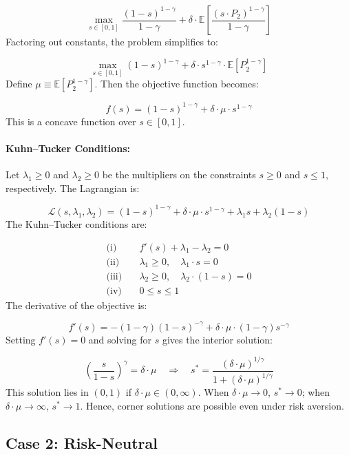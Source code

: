 \documentclass[12pt]{article}
\begin{document}
\[
\max_{s \in [0,1]}  \frac{(1 - s)^{1 - \gamma}}{1 - \gamma} + \delta \cdot \mathbb{E} \left[ \frac{(s \cdot P_2)^{1 - \gamma}}{1 - \gamma} \right] 
\]
Factoring out constants, the problem simplifies to:

\[
\max_{s \in [0,1]}  (1 - s)^{1 - \gamma} + \delta \cdot s^{1 - \gamma} \cdot \mathbb{E}[P_2^{1 - \gamma}] 
\]
Define \( \mu \equiv \mathbb{E}[P_2^{1 - \gamma}] \). Then the objective function becomes:

\[
f(s) = (1 - s)^{1 - \gamma} + \delta \cdot \mu \cdot s^{1 - \gamma}
\]
This is a concave function over \( s \in [0,1] \).

\paragraph{Kuhn–Tucker Conditions:}
Let \( \lambda_1 \geq 0 \) and \( \lambda_2 \geq 0 \) be the multipliers on the constraints \( s \geq 0 \) and \( s \leq 1 \), respectively. The Lagrangian is:

\[
\mathcal{L}(s, \lambda_1, \lambda_2) = (1 - s)^{1 - \gamma} + \delta \cdot \mu \cdot s^{1 - \gamma} + \lambda_1 s + \lambda_2 (1 - s)
\]
The Kuhn–Tucker conditions are:

\begin{align*}
\text{(i)} \quad & f'(s) + \lambda_1 - \lambda_2 = 0 \\
\text{(ii)} \quad & \lambda_1 \geq 0,\quad \lambda_1 \cdot s = 0 \\
\text{(iii)} \quad & \lambda_2 \geq 0,\quad \lambda_2 \cdot (1 - s) = 0 \\
\text{(iv)} \quad & 0 \leq s \leq 1
\end{align*}
The derivative of the objective is:

\[
f'(s) = - (1 - \gamma)(1 - s)^{-\gamma} + \delta \cdot \mu \cdot (1 - \gamma) s^{-\gamma}
\]
Setting \( f'(s) = 0 \) and solving for \( s \) gives the interior solution:

\[
\left( \frac{s}{1 - s} \right)^\gamma = \delta \cdot \mu
\quad \Longrightarrow \quad
s^* = \frac{(\delta \cdot \mu)^{1/\gamma}}{1 + (\delta \cdot \mu)^{1/\gamma}}
\]
This solution lies in \( (0,1) \) if \( \delta \cdot \mu \in (0, \infty) \). When \( \delta \cdot \mu \to 0 \), \( s^* \to 0 \); when \( \delta \cdot \mu \to \infty \), \( s^* \to 1 \). Hence, corner solutions are possible even under risk aversion.

\subsection{Case 2: Risk-Neutral}
\end{document}
